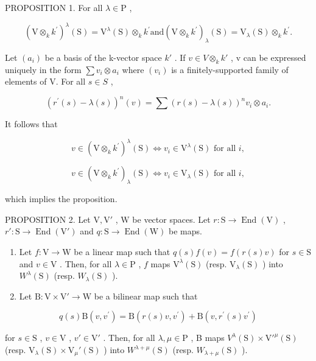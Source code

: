 PROPOSITION 1. For all \(\lambda \in \mathrm{P}\) ,

\[
(\mathrm{V} \otimes_ {k} k ^ {\prime}) ^ {\lambda} (\mathrm{S}) = \mathrm{V} ^ {\lambda} (\mathrm{S}) \otimes_ {k} k ^ {\prime} \text {and} (\mathrm{V} \otimes_ {k} k ^ {\prime}) _ {\lambda} (\mathrm{S}) = \mathrm{V} _ {\lambda} (\mathrm{S}) \otimes_ {k} k ^ {\prime}.
\]

Let \((a_{i})\) be a basis of the k-vector space \(k'\) . If \(v \in V \otimes_{k} k'\) , v can be expressed uniquely in the form \(\sum v_{i} \otimes a_{i}\) where \((v_{i})\) is a finitely-supported family of elements of V. For all \(s \in S\) ,

\[
(r ^ {\prime} (s) - \lambda (s)) ^ {n} (v) = \sum (r (s) - \lambda (s)) ^ {n} v _ {i} \otimes a _ {i}.
\]

It follows that

\[
v \in (\mathrm{V} \otimes_ {k} k ^ {\prime}) ^ {\lambda} (\mathrm{S}) \Longleftrightarrow v _ {i} \in \mathrm{V} ^ {\lambda} (\mathrm{S}) \text { for   all } i,
\]

\[
v \in (\mathrm{V} \otimes_ {k} k ^ {\prime}) _ {\lambda} (\mathrm{S}) \Longleftrightarrow v _ {i} \in \mathrm{V} _ {\lambda} (\mathrm{S}) \text { for   all } i,
\]

which implies the proposition.

PROPOSITION 2. Let \(\mathrm{V}, \mathrm{V}'\) , \(\mathrm{W}\) be vector spaces. Let \(r: \mathrm{S} \to \operatorname{End}(\mathrm{V})\) , \(r': \mathrm{S} \to \operatorname{End}(\mathrm{V}')\) and \(q: \mathrm{S} \to \operatorname{End}(\mathrm{W})\) be maps.

\begin{enumerate}
\def\labelenumi{(\roman{enumi})}
\item
  Let \(f: \mathrm{V} \to \mathrm{W}\) be a linear map such that \(q(s)f(v) = f(r(s)v)\) for \(s \in \mathrm{S}\) and \(v \in \mathrm{V}\) . Then, for all \(\lambda \in \mathrm{P}\) , \(f\) maps \(\mathrm{V}^{\lambda}(\mathrm{S})\) (resp. \(\mathrm{V}_{\lambda}(\mathrm{S})\) ) into \(W^{\lambda}(\mathrm{S})\) (resp. \(W_{\lambda}(\mathrm{S})\) ).
\item
  Let \(\mathrm{B}:\mathrm{V}\times \mathrm{V}'\to \mathrm{W}\) be a bilinear map such that
\end{enumerate}

\[
q (s) \mathrm{B} (v, v ^ {\prime}) = \mathrm{B} (r (s) v, v ^ {\prime}) + \mathrm{B} (v, r ^ {\prime} (s) v ^ {\prime})
\]

for \(s \in \mathrm{S}\) , \(v \in \mathrm{V}\) , \(v' \in \mathrm{V}'\) . Then, for all \(\lambda, \mu \in \mathrm{P}\) , B maps \(V^{\lambda}(\mathrm{S}) \times \mathrm{V}'^{\mu}(\mathrm{S})\) (resp. \(\mathrm{V}_{\lambda}(\mathrm{S}) \times \mathrm{V}_{\mu}'(\mathrm{S})\) ) into \(W^{\lambda + \mu}(\mathrm{S})\) (resp. \(W_{\lambda + \mu}(\mathrm{S})\) ).

